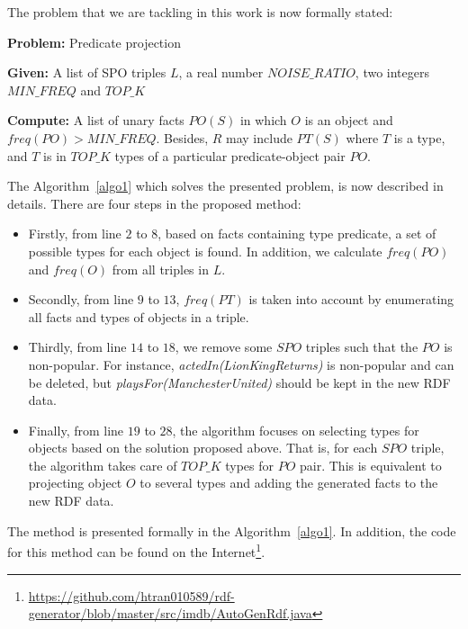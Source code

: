 \documentclass{acm_proc_article-sp}
\begin{document}
The problem that we are tackling in this work is now formally stated:

\begin{framed}
\textbf{Problem:} Predicate projection

\textbf{Given:} A list of SPO triples $L$, a real number $NOISE\_RATIO$, two integers $MIN\_FREQ$ and $TOP\_K$

\textbf{Compute:} A list of unary facts $PO(S)$ in which $O$ is an object and $freq(PO) > MIN\_FREQ$. Besides, $R$ may include $PT(S)$ where $T$ is a type, and $T$ is in $TOP\_K$ types of a particular predicate-object pair $PO$.
\end{framed}

The Algorithm~\ref{algo1} which solves the presented problem, is now described in details. There are four steps in the proposed method:
\begin{itemize}
\item Firstly, from line $2$ to $8$, based on facts containing type predicate, a set of possible types for each object is found. In addition, we calculate $freq(PO)$ and $freq(O)$ from all triples in $L$.
\item Secondly, from line $9$ to $13$, $freq(PT)$ is taken into account by enumerating all facts and types of objects in a triple.
\item Thirdly, from line $14$ to $18$, we remove some $SPO$ triples such that the $PO$ is non-popular. For instance, \textit{actedIn(LionKingReturns)} is non-popular and can be deleted, but \textit{playsFor(ManchesterUnited)} should be kept in the new RDF data.
\item Finally, from line $19$ to $28$, the algorithm focuses on selecting types for objects based on the solution proposed above. That is, for each $SPO$ triple, the algorithm takes care of $TOP\_K$ types for $PO$ pair. This is equivalent to projecting object $O$ to several types and adding the generated facts to the new RDF data.
\end{itemize}

The method is presented formally in the Algorithm~\ref{algo1}. In addition, the code for this method can be found on the Internet\footnote{\url{https://github.com/htran010589/rdf-generator/blob/master/src/imdb/AutoGenRdf.java}}.
\end{document}
